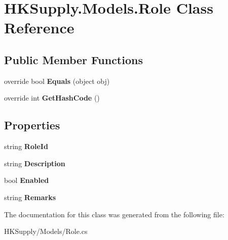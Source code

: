 \hypertarget{class_h_k_supply_1_1_models_1_1_role}{}\section{H\+K\+Supply.\+Models.\+Role Class Reference}
\label{class_h_k_supply_1_1_models_1_1_role}
\subsection*{Public Member Functions}
\begin{DoxyCompactItemize}
\item 
\mbox{\label{class_h_k_supply_1_1_models_1_1_role_a2e757fafcf931439338d7d02aa2db18a}} 
override bool {\bfseries Equals} (object obj)
\item 
\mbox{\label{class_h_k_supply_1_1_models_1_1_role_a9b7a1c7c9b48374df64a6e8b1080877e}} 
override int {\bfseries Get\+Hash\+Code} ()
\end{DoxyCompactItemize}
\subsection*{Properties}
\begin{DoxyCompactItemize}
\item 
\mbox{\label{class_h_k_supply_1_1_models_1_1_role_ad01af6b00ac5b74ab7289ea10222e79c}} 
string {\bfseries Role\+Id}
\item 
\mbox{\label{class_h_k_supply_1_1_models_1_1_role_aa44073fe223057d72f5a478ed48f9c21}} 
string {\bfseries Description}
\item 
\mbox{\label{class_h_k_supply_1_1_models_1_1_role_ab925a57eeb388f06023a53f39116db1c}} 
bool {\bfseries Enabled}
\item 
\mbox{\label{class_h_k_supply_1_1_models_1_1_role_a6a9c5c8439262eb82222f80c52e2c0b9}} 
string {\bfseries Remarks}
\end{DoxyCompactItemize}


The documentation for this class was generated from the following file\+:\begin{DoxyCompactItemize}
\item 
H\+K\+Supply/\+Models/Role.\+cs\end{DoxyCompactItemize}
